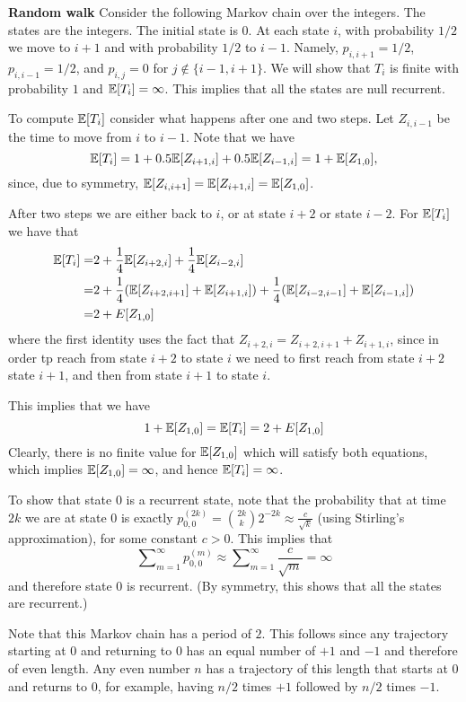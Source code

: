 \begin{example}{\bf Random walk}
Consider the following Markov chain over the integers. The states
are the integers. The initial state is $0$. At each state $i$, with
probability $1/2$ we move to $i+1$ and with probability $1/2$ to
$i-1$. Namely, $p_{i,i+1}=1/2$, $p_{i,i-1}=1/2$, and $p_{i,j} =0$
for $j \not\in \{i-1,i+ 1\}$. We will show that $T_i$ is finite with
probability $1$ and $\mathbb{E}[T_i]=\infty$. This implies that all the
states are null recurrent.

To compute $\mathbb{E}[T_i]$ consider what happens after one and two steps. Let
$Z_{i,i-1}$ be the time to move from $i$ to $i-1$. Note that  we
have \[
\mathbb{E}[T_i]=1+0.5\mathbb{E}[Z_{i+1,i}]+0.5\mathbb{E}[Z_{i-1,i}]=1+\mathbb{E}[Z_{1,0}],
\]
since, due to symmetry, $\mathbb{E}[Z_{i,i+1}]=\mathbb{E}[Z_{i+1,i}]=\mathbb{E}[Z_{1,0}]$.

After two steps we are either back to $i$, or at state $i+2$ or state $i-2$.
For $\mathbb{E}[T_i]$ we have that
\begin{align*}
\mathbb{E}[T_i]=&
2+\frac{1}{4}\mathbb{E}[Z_{i+2,i}]+\frac{1}{4}\mathbb{E}[Z_{i-2,i}] \\
=&2+\frac{1}{4} (\mathbb{E}[Z_{i+2,i+1}]+\mathbb{E}[Z_{i+1,i}])+\frac{1}{4}( \mathbb{E}[Z_{i-2,i-1}]+\mathbb{E}[Z_{i-1,i}])\\
 =&2+E[Z_{1,0}]\\
\end{align*}
where the first identity uses the fact that $Z_{i+2,i}=Z_{i+2,i+1}+Z_{i+1,i}$, since in order tp reach from state $i+2$ to state $i$ we need to first reach from state $i+2$ state $i+1$, and then from state $i+1$ to state $i$.

This implies that we have
\[
1+\mathbb{E}[Z_{1,0}]=\mathbb{E}[T_i]=2+E[Z_{1,0}]
\]
Clearly, there is no finite value for $\mathbb{E}[Z_{1,0}]$ which will
satisfy both equations, which implies $\mathbb{E}[Z_{1,0}]=\infty$, and hence
$\mathbb{E}[T_i]=\infty$.

To show that state $0$ is a recurrent state, note that the probability
that at time $2k$ we are at state $0$ is exactly $p_{0,0}^{(2k)}=\binom{2k}{k}2^{-2k}\approx \frac{c}{\sqrt{k}}$ (using Stirling's approximation), for some constant $c>0$. This
implies that
$$
\sum\nolimits_{m = 1}^\infty {p_{0,0}^{(m)}}\approx \sum\nolimits_{m
= 1}^\infty \frac{c}{\sqrt{m}}=\infty
$$
and therefore state $0$ is recurrent. (By symmetry, this shows that
all the states are recurrent.)

Note that this Markov chain has a period of $2$. This follows since any trajectory starting at $0$ and returning to $0$ has an equal number of $+1$ and $-1$ and therefore of even length. Any even number $n$ has a trajectory of this length that starts at $0$ and returns to $0$, for example, having $n/2$ times $+1$ followed by $n/2$ times $-1$.
\end{example}

